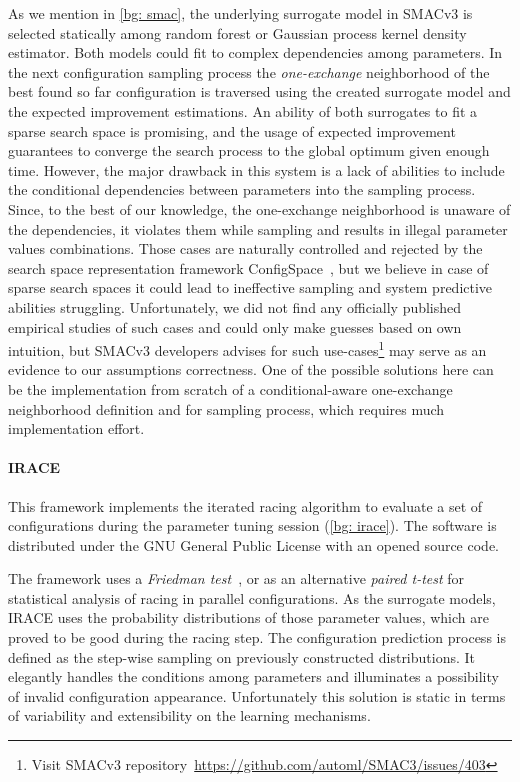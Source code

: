 As we mention in \cref{bg: smac}, the underlying surrogate model in SMACv3 is selected statically among random forest or Gaussian process kernel density estimator. Both models could fit to complex dependencies among parameters. In the next configuration sampling process the \emph{one-exchange} neighborhood of the best found so far configuration is traversed using the created surrogate model and the expected improvement estimations. An ability of both surrogates to fit a sparse search space is promising, and the usage of expected improvement guarantees to converge the search process to the global optimum given enough time. However, the major drawback in this system is a lack of abilities to include the conditional dependencies between parameters into the sampling process. Since, to the best of our knowledge, the one-exchange neighborhood is unaware of the dependencies, it violates them while sampling and results in illegal parameter values combinations. Those cases are naturally controlled and rejected by the search space representation framework ConfigSpace~\cite{configspace}, but we believe in case of sparse search spaces it could lead to ineffective sampling and system predictive abilities struggling. Unfortunately, we did not find any officially published empirical studies of such cases and could only make guesses based on own intuition, but SMACv3 developers advises for such use-cases\footnote{Visit SMACv3 repository~\url{https://github.com/automl/SMAC3/issues/403}} may serve as an evidence to our assumptions correctness. One of the possible solutions here can be the implementation from scratch of a conditional-aware one-exchange neighborhood definition and for sampling process, which requires much implementation effort.

\paragraph{IRACE} This framework implements the iterated racing algorithm to evaluate a set of configurations during the parameter tuning session (\cref{bg: irace}). The software is distributed under the GNU General Public License with an opened source code.

The framework uses a \emph{Friedman test}~\cite{conover1980practical}, or as an alternative \emph{paired t-test} for statistical analysis of racing in parallel configurations. As the surrogate models, IRACE uses the probability distributions of those parameter values, which are proved to be good during the racing step. The configuration prediction process is defined as the step-wise sampling on previously constructed distributions. It elegantly handles the conditions among parameters and illuminates a possibility of invalid configuration appearance. Unfortunately this solution is static in terms of variability and extensibility on the learning mechanisms.

